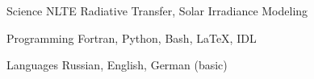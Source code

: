 

\begin{cvskills}

  \cvskill
    {Science} %
    {NLTE Radiative Transfer, Solar Irradiance Modeling} %

  \cvskill
    {Programming} %
    {Fortran, Python, Bash, LaTeX, IDL} %

  \cvskill
    {Languages} %
    {Russian, English, German (basic)} %

\end{cvskills}
